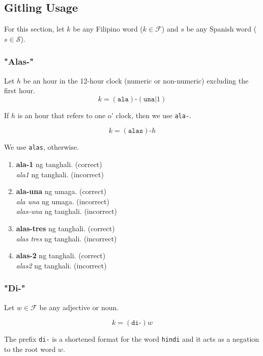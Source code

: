 \subsection{Gitling Usage}
\label{gitling_usage}
For this section, let $k$ be any Filipino word (\(k\in\mathcal{F}\)) and $s$ be any Spanish word (\(s\in\mathcal{S}\)).

\subsubsection{"Alas-"}

Let \(h\) be an hour in the 12-hour clock (numeric or non-numeric) excluding the first hour.
\[
      k = (\texttt{ala})\texttt{-}(\texttt{una} | 1)
\]

If $h$ is an hour that refers to one o' clock, then we use \texttt{ala-}.

\[
      k = (\texttt{alas})\texttt{-}h
\]

We use \texttt{alas}, otherwise.

\begin{example}
\end{example}
\begin{enumerate}
      \item \textbf{ala-1} ng tanghali. (correct) \\
            \textit{ala1} ng tanghali. (incorrect)
      \item \textbf{ala-una} ng umaga. (correct) \\
            \textit{ala una} ng umaga. (incorrect) \\
            \textit{alas-una} ng tanghali. (incorrect)
      \item \textbf{alas-tres} ng tanghali. (correct) \\
            \textit{alas tres} ng tanghali. (incorrect)
      \item \textbf{alas-2} ng tanghali. (correct) \\
            \textit{alas2} ng tanghali. (incorrect)
\end{enumerate}

\subsubsection{"Di-"}

Let $w\in\mathcal{F}$ be any adjective or noun.

\[
      k = (\texttt{di-})w
\]

The prefix \texttt{di-} is a shortened format for the word \texttt{hindi} and it acts as a negation to the root word $w$.

